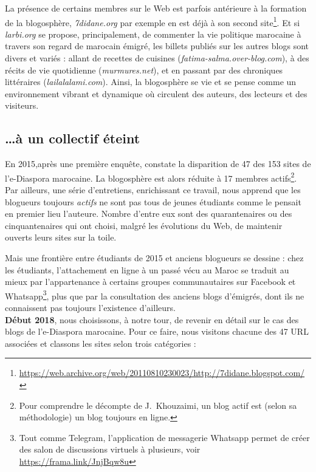 \documentclass[symmetric,justified,marginals=raggedouter]{tufte-book}
\begin{document}
La présence de certains membres sur le Web est parfois antérieure à la formation de la blogosphère, \textit{7didane.org} par exemple en est déjà à son second site\footnote{\RaggedOuter \url{https://web.archive.org/web/20110810230023/http://7didane.blogspot.com/}}. Et si \textit{larbi.org} se propose, principalement, de commenter la vie politique marocaine à travers son regard de marocain émigré, les billets publiés sur les autres blogs sont divers et variés : allant de recettes de cuisines (\textit{fatima-salma.over-blog.com}), à des récits de vie quotidienne (\textit{murmures.net}), et en passant par des chroniques littéraires (\textit{lailalalami.com}).  Ainsi, la blogosphère se vie et se pense comme un environnement vibrant et dynamique où circulent des auteurs, des lecteurs et des visiteurs.

\subsection{\ldots{}à un collectif éteint}

\noindent En 2015,après une première enquête, \citep{khouzaimi_e-diasporas_2015} constate la disparition de 47 des 153 sites de l'e-Diaspora marocaine. La blogosphère est alors réduite à 17 membres actifs\footnote{\RaggedOuter Pour comprendre le décompte de J.~Khouzaimi, un blog actif est (selon sa méthodologie) un blog toujours en ligne.}. Par ailleurs, une série d'entretiens, enrichissant ce travail, nous apprend que les blogueurs toujours \textit{actifs} ne sont pas tous de jeunes étudiants comme le pensait en premier lieu l'auteure. Nombre d'entre eux sont des quarantenaires ou des cinquantenaires qui ont choisi, malgré les évolutions du Web, de maintenir ouverts leurs sites sur la toile. 

Mais une frontière entre étudiants de 2015 et anciens blogueurs se dessine : chez les étudiants, l'attachement en ligne à un passé vécu au Maroc se traduit au mieux par l'appartenance à certains groupes communautaires sur Facebook et Whatsapp\footnote{\RaggedOuter Tout comme Telegram, l'application de messagerie Whatsapp permet de créer des salon de discussions virtuels à plusieurs, voir \url{https://frama.link/JnjBqw8u}}, plus que par la consultation des anciens blogs d'émigrés, dont ils ne connaissent pas toujours l'existence d'ailleurs. \\

\noindent \textbf{Début 2018}, nous choisissons, à notre tour, de revenir en détail sur le cas des blogs de l'e-Diaspora marocaine. Pour ce faire, nous visitons chacune des 47 URL associées et classons les sites selon trois catégories :
\end{document}
